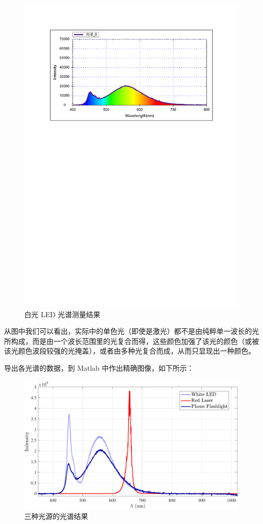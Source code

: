 \documentclass[UTF8]{article}
\theoremstyle{MyLineTheoremStyle} %
\theoremstyle{MyBlockTheoremStyle} %
\theoremstyle{MySubsubsectionStyle} %
\begin{document}
\begin{figure}[H]\centering
    \includegraphics[width=\columnwidth]{assets/5 光谱仪/手机手电筒.pdf}
    \caption{白光 LED 光谱测量结果}
\end{figure}

从图中我们可以看出，实际中的单色光（即使是激光）都不是由纯粹单一波长的光所构成，而是由一个波长范围里的光复合而得，这些颜色加强了该光的颜色（或被该光颜色波段较强的光掩盖），或者由多种光复合而成，从而只显现出一种颜色。

导出各光谱的数据，到 Matlab 中作出精确图像，如下所示：

\begin{figure}[H]\centering
    \includegraphics[width=\columnwidth]{assets/5 光谱仪/2024-11-06_00-44-38.pdf}
    \caption{三种光源的光谱结果}\label{三种光源的光谱结果}
\end{figure}
\end{document}
